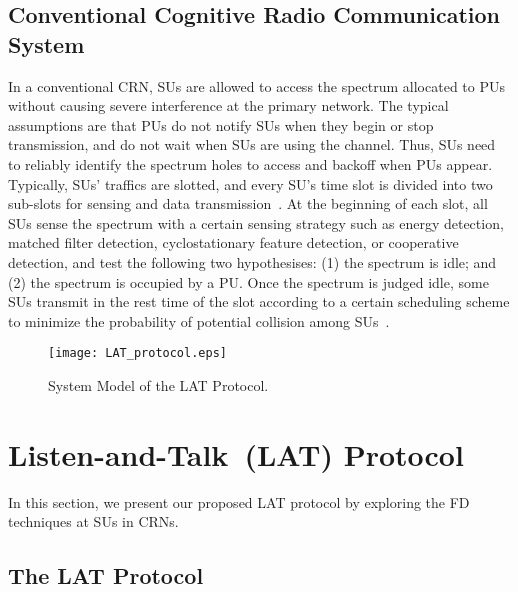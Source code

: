 \documentclass[onecolumn,12pt]{IEEEtran}
\begin{document}
\subsection{Conventional Cognitive Radio Communication System}

In a conventional CRN, SUs are allowed to access the spectrum allocated to PUs without causing severe interference at the primary network. The typical assumptions are that PUs do not notify SUs when they begin or stop transmission, and do not wait when SUs are using the channel. Thus, SUs need to reliably identify the spectrum holes to access and backoff when PUs appear. Typically, SUs' traffics are slotted, and every SU's time slot is divided into two sub-slots for sensing and data transmission~\cite{yucek2009survey}. At the beginning of each slot, all SUs sense the spectrum with a certain sensing strategy such as energy detection, matched filter detection, cyclostationary feature detection, or cooperative detection, and test the following two hypothesises: (1) the spectrum is idle; and (2) the spectrum is occupied by a PU. Once the spectrum is judged idle, some SUs transmit in the rest time of the slot according to a certain scheduling scheme to minimize the probability of potential collision among SUs~\cite{Xin2008}.



\begin{figure}[ht]
\centering
\texttt{[image: LAT\_protocol.eps]}
\caption{System Model of the LAT Protocol.} \label{LAT}
\end{figure}
\section{Listen-and-Talk~(LAT) Protocol}

In this section, we present our proposed LAT protocol by exploring the FD techniques at SUs in CRNs.

\subsection{The LAT Protocol}
\end{document}
